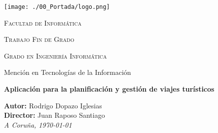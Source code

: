 \begin{titlepage}
\begin{center}
\thispagestyle{none}
\pagestyle{none}

\vspace*{1cm}
\texttt{[image: ./00\_Portada/logo.png]}

\textsc{Facultad de Informática}

\vspace*{1.5cm}

\textsc{\Large{Trabajo Fin de Grado}}

\vspace*{0.4cm}

\textsc{\Large{Grado en Ingeniería Informática}}

\vspace*{0.4cm}

\large{Mención en Tecnologías de la Información}

\vspace*{3cm}

\textbf{\LARGE{Aplicación para la planificación y gestión de viajes turísticos}}

\end{center}

\vspace*{4cm}

\begin{flushright}
\large{
\textbf{Autor: } Rodrigo Dopazo Iglesias\\
\textbf{Director: } Juan Raposo Santiago\\
\hfill \break
\textit{A Coruña, \today}}
\end{flushright}

\end{titlepage}